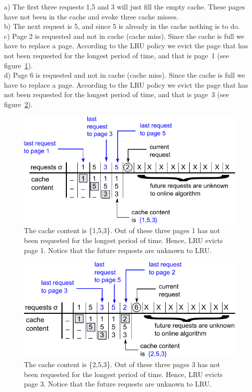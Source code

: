 \documentclass[a4paper,12pt, titlepage]{article}  %
\begin{document}
\noindent a) The first three requests 1,5 and 3 will just fill the empty cache. These pages have not been
in the cache and evoke three cache misses.\\
b) The next request is 5, and since 5 is already in the cache nothing is to do.\\
c) Page 2 is requested and not in cache (cache miss). Since the cache is full we have to replace a page. 
According to the LRU policy we evict the page that has not been requested for the longest period of time, 
and that is page~1 (see figure~\ref{fig:LRU_example_c}).\\ 
d) Page 6 is requested and not in cache (cache miss). Since the cache is full we have to replace a page. 
According to the LRU policy we evict the page that has not been requested for the longest period of time, 
and that is page~3 (see figure~\ref{fig:LRU_example_d}). 


\begin{figure}[ht]
	\centering
	\includegraphics[scale=0.95]{./figures/LRU_example_c.pdf}
	\caption{The cache content is \{1,5,3\}. Out of these three pages
	         1 has not been requested for the longest period of time. Hence, LRU evicts page 1.
	         Notice that the future requests are unknown to LRU.}
	\label{fig:LRU_example_c}
\end{figure}

\begin{figure}[ht]
	\centering
	\includegraphics[scale=0.95]{./figures/LRU_example_d.pdf}
	\caption{The cache content is \{2,5,3\}. Out of these three pages
	         3 has not been requested for the longest period of time. Hence, LRU evicts page 3.
	         Notice that the future requests are unknown to LRU.}
	\label{fig:LRU_example_d}
\end{figure}
\end{document}
